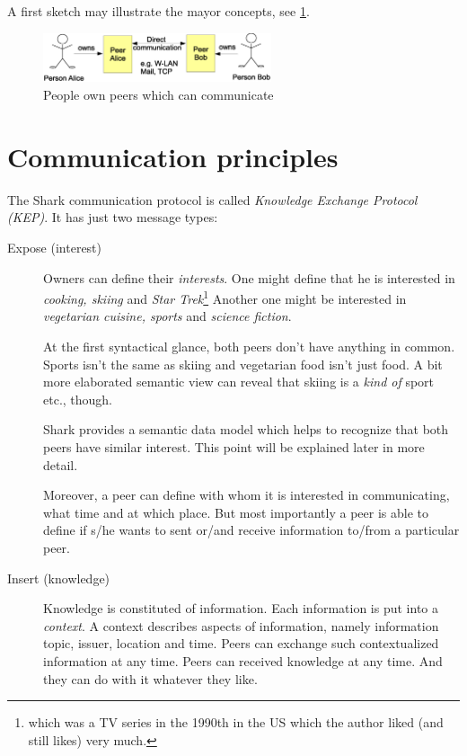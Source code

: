 A first sketch may illustrate the mayor concepts, see \ref{fig:generalConcept}.

\begin{figure}[t]
\centering
\includegraphics[width=0.60\textwidth]{generalConcept.eps}
\caption{People own peers which can communicate}
\label{fig:generalConcept}
\end{figure}

\section{Communication principles}
The Shark communication protocol is called {\it Knowledge Exchange Protocol (KEP)}. It has just two message types:

\begin{description}
    \item[Expose (interest)]
Owners can define their {\it interests}. One might define that he is interested in {\it cooking, skiing} and {\it Star Trek}\footnote{which was a TV series in the 1990th in the US which the author liked (and still likes) very much.} Another one might be interested in {\it vegetarian cuisine, sports} and {\it science fiction}.

At the first syntactical glance, both peers don't have anything in common. Sports isn't the same as skiing and vegetarian food isn't just food. A bit more elaborated semantic view can reveal that skiing is a {\it kind of} sport etc., though.

Shark provides a semantic data model which helps to recognize that both peers have similar interest. This point will be explained later in more detail.

Moreover, a peer can define with whom it is interested in communicating, what time and at which place. But most importantly a peer is able to define if s/he wants to sent or/and receive information to/from a particular peer.

    \item[Insert (knowledge)]
Knowledge is constituted of information. Each information is put into a {\it context}. A context describes aspects of information, namely information topic, issuer, location and time. Peers can exchange such contextualized information at any time. Peers can received knowledge at any time. And they can do with it whatever they like.
\end{description}

